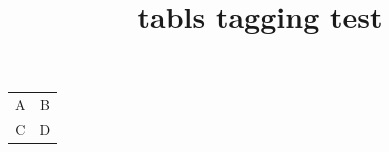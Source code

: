\documentclass{article}
\title{tabls tagging test}
\begin{document}
\begin{tabular}{cc}
A & B \\
C & D \\
\end{tabular}
\end{document}
